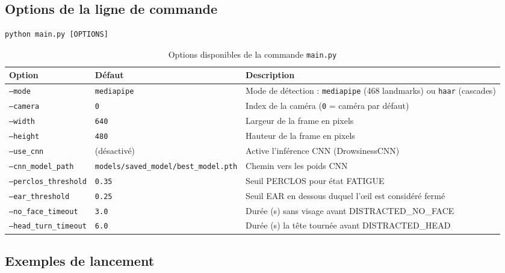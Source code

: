 \documentclass[12pt,a4paper]{report}
\begin{document}
\subsection{Options de la ligne de commande}

\begin{lstlisting}[style=python, caption={Syntaxe de lancement du DMS (main.py)}, label=lst:usage]
python main.py [OPTIONS]
\end{lstlisting}

\begin{table}[H]
\centering
\caption{Options disponibles de la commande \texttt{main.py}}
\label{tab:cli_options}
\begin{tabular}{L{3.8cm} C{2.5cm} L{6cm}}
\toprule
\textbf{Option} & \textbf{D\'efaut} & \textbf{Description} \\
\midrule
\texttt{--mode} & \texttt{mediapipe} & Mode de d\'etection : \texttt{mediapipe} (468 landmarks) ou \texttt{haar} (cascades) \\
\texttt{--camera} & \texttt{0} & Index de la cam\'era (\texttt{0} = cam\'era par d\'efaut) \\
\texttt{--width} & \texttt{640} & Largeur de la frame en pixels \\
\texttt{--height} & \texttt{480} & Hauteur de la frame en pixels \\
\texttt{--use\_cnn} & (d\'esactiv\'e) & Active l'inf\'erence CNN (DrowsinessCNN) \\
\texttt{--cnn\_model\_path} & \texttt{models/saved\_model/best\_model.pth} & Chemin vers les poids CNN \\
\texttt{--perclos\_threshold} & \texttt{0.35} & Seuil PERCLOS pour \'etat FATIGUE \\
\texttt{--ear\_threshold} & \texttt{0.25} & Seuil EAR en dessous duquel l'\oe il est consid\'er\'e ferm\'e \\
\texttt{--no\_face\_timeout} & \texttt{3.0} & Dur\'ee (s) sans visage avant DISTRACTED\_NO\_FACE \\
\texttt{--head\_turn\_timeout} & \texttt{6.0} & Dur\'ee (s) la t\^ete tourn\'ee avant DISTRACTED\_HEAD \\
\bottomrule
\end{tabular}
\end{table}

\subsection{Exemples de lancement}
\end{document}
